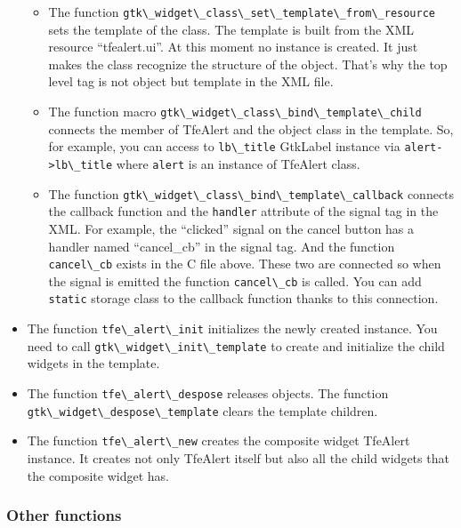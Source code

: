 \begin{itemize}
  \begin{itemize}
  \tightlist
  \item
    The function
    \passthrough{\lstinline!gtk\_widget\_class\_set\_template\_from\_resource!}
    sets the template of the class. The template is built from the XML
    resource ``tfealert.ui''. At this moment no instance is created. It
    just makes the class recognize the structure of the object. That's
    why the top level tag is not object but template in the XML file.
  \item
    The function macro
    \passthrough{\lstinline!gtk\_widget\_class\_bind\_template\_child!}
    connects the member of TfeAlert and the object class in the
    template. So, for example, you can access to
    \passthrough{\lstinline!lb\_title!} GtkLabel instance via
    \passthrough{\lstinline!alert->lb\_title!} where
    \passthrough{\lstinline!alert!} is an instance of TfeAlert class.
  \item
    The function
    \passthrough{\lstinline!gtk\_widget\_class\_bind\_template\_callback!}
    connects the callback function and the
    \passthrough{\lstinline!handler!} attribute of the signal tag in the
    XML. For example, the ``clicked'' signal on the cancel button has a
    handler named ``cancel\_cb'' in the signal tag. And the function
    \passthrough{\lstinline!cancel\_cb!} exists in the C file above.
    These two are connected so when the signal is emitted the function
    \passthrough{\lstinline!cancel\_cb!} is called. You can add
    \passthrough{\lstinline!static!} storage class to the callback
    function thanks to this connection.
  \end{itemize}
\item
  The function \passthrough{\lstinline!tfe\_alert\_init!} initializes
  the newly created instance. You need to call
  \passthrough{\lstinline!gtk\_widget\_init\_template!} to create and
  initialize the child widgets in the template.
\item
  The function \passthrough{\lstinline!tfe\_alert\_despose!} releases
  objects. The function
  \passthrough{\lstinline!gtk\_widget\_despose\_template!} clears the
  template children.
\item
  The function \passthrough{\lstinline!tfe\_alert\_new!} creates the
  composite widget TfeAlert instance. It creates not only TfeAlert
  itself but also all the child widgets that the composite widget has.
\end{itemize}

\subsubsection{Other functions}\label{other-functions}

